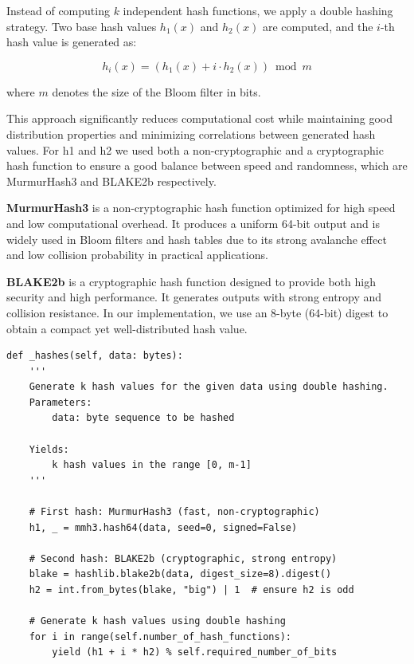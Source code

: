 Instead of computing $k$ independent hash functions, we apply a double hashing strategy. 
Two base hash values $h_1(x)$ and $h_2(x)$ are computed, and the $i$-th hash value is generated as:

\[
h_i(x) = \left(h_1(x) + i \cdot h_2(x)\right) \bmod m
\]

where $m$ denotes the size of the Bloom filter in bits.

This approach significantly reduces computational cost while maintaining good distribution 
properties and minimizing correlations between generated hash values. For h1 and h2 we used both a non-cryptographic and a cryptographic hash function to ensure a good balance between speed and randomness, which are MurmurHash3 and BLAKE2b respectively.

\textbf{MurmurHash3} is a non-cryptographic hash function optimized for high speed and low computational overhead. 
It produces a uniform 64-bit output and is widely used in Bloom filters and hash tables due to its strong 
avalanche effect and low collision probability in practical applications.

\medskip

\textbf{BLAKE2b} is a cryptographic hash function designed to provide both high security and high performance. 
It generates outputs with strong entropy and collision resistance. 
In our implementation, we use an 8-byte (64-bit) digest to obtain a compact yet well-distributed hash value.



\begin{lstlisting}
def _hashes(self, data: bytes):
    '''
    Generate k hash values for the given data using double hashing.
    Parameters:
        data: byte sequence to be hashed

    Yields:
        k hash values in the range [0, m-1]
    '''

    # First hash: MurmurHash3 (fast, non-cryptographic)
    h1, _ = mmh3.hash64(data, seed=0, signed=False)

    # Second hash: BLAKE2b (cryptographic, strong entropy)
    blake = hashlib.blake2b(data, digest_size=8).digest()
    h2 = int.from_bytes(blake, "big") | 1  # ensure h2 is odd

    # Generate k hash values using double hashing
    for i in range(self.number_of_hash_functions):
        yield (h1 + i * h2) % self.required_number_of_bits
\end{lstlisting}


